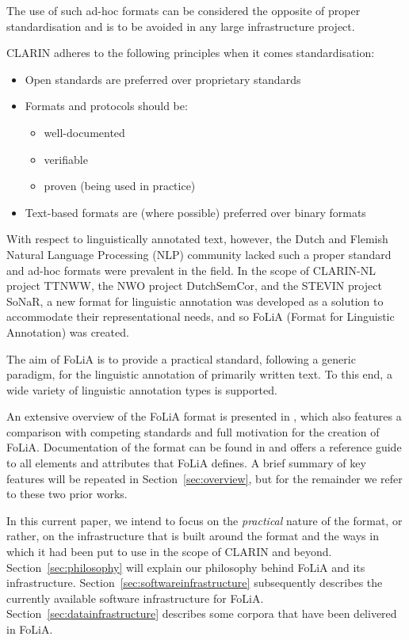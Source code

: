 \documentclass[a4paper,10pt,twoside]{article}
\begin{document}
The use of such ad-hoc formats can be considered the opposite of proper
standardisation and is to be avoided in any large infrastructure project. 

CLARIN adheres to the following principles when it comes standardisation:

\begin{itemize}
    \item Open standards are preferred over proprietary standards
    \item Formats and protocols should be:
    \begin{itemize}
        \item well-documented
        \item verifiable
        \item proven (being used in practice)
    \end{itemize}
    \item Text-based formats are (where possible) preferred over binary formats
\end{itemize}

With respect to linguistically annotated text, however, the Dutch and Flemish
Natural Language Processing (NLP) community lacked such a proper standard and ad-hoc formats were prevalent
in the field.  In the scope of CLARIN-NL project TTNWW, the NWO project
DutchSemCor, and the STEVIN project SoNaR, a new format for linguistic
annotation was developed as a solution to accommodate their representational needs, and so
FoLiA (Format for Linguistic Annotation) was created.

The aim of FoLiA is to provide a practical standard, following a generic
paradigm, for the linguistic annotation of primarily written text. To this end,
a wide variety of linguistic annotation types is supported. 

An extensive overview of the FoLiA format is presented in ,
which also features a comparison with competing standards and full motivation
for the creation of FoLiA. Documentation of the format  can be found in
 and offers a reference guide to all elements and attributes
that FoLiA defines.  A brief summary of key features will be repeated in
Section~\ref{sec:overview}, but for the remainder we refer to these two prior
works.

In this current paper, we intend to focus on the \emph{practical} nature of the
format, or rather, on the infrastructure that is built around the format and
the ways in which it had been put to use in the scope of CLARIN and beyond.
Section~\ref{sec:philosophy} will explain our philosophy behind FoLiA and its
infrastructure. Section~\ref{sec:softwareinfrastructure} subsequently describes
the currently available software infrastructure for FoLiA.
Section~\ref{sec:datainfrastructure} describes some corpora that have been
delivered in FoLiA.
\end{document}

